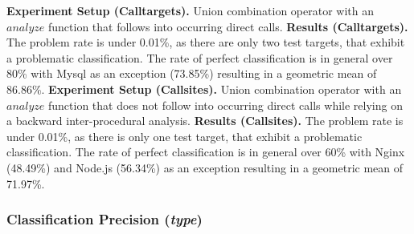 \textbf{Experiment Setup (Calltargets).} Union combination operator with an $analyze$ function that follows into occurring direct calls.
\textbf{Results (Calltargets).} The problem rate is under 0.01\%, as there are only two test targets, that exhibit a problematic classification. The rate of perfect classification is in general over 80\% with Mysql as an exception (73.85\%) resulting in a geometric mean of 86.86\%.
\textbf{Experiment Setup (Callsites).} Union combination operator with an $analyze$ function that does not follow into occurring direct calls while relying on a backward inter-procedural analysis.
\textbf{Results (Callsites).} The problem rate is under 0.01\%, as there is only one test target, that exhibit a problematic classification. The rate of perfect classification is in general over 60\% with Nginx (48.49\%) 
and Node.js (56.34\%) as an exception resulting in a geometric mean of 71.97\%.


\subsubsection{Classification Precision (\textit{type})}
\label{subsection:typeshieldcountprecision}


